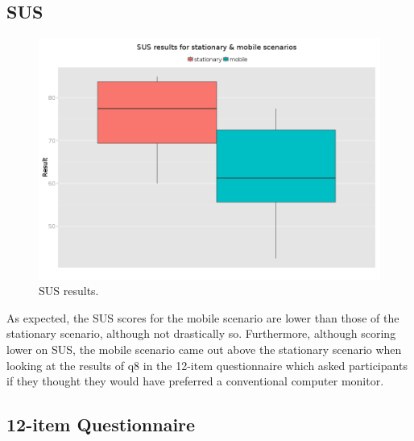 
\pagebreak

\subsection{SUS}

\begin{figure}[h]
	\begin{center}
		\includegraphics[width=0.7\linewidth]{images/1/sus.png}
		\caption{SUS results.}
		\label{sus}
	\end{center}
\end{figure}

As expected, the SUS scores for the mobile scenario are lower than those of the stationary scenario, although not drastically so. Furthermore, although scoring lower on SUS, the mobile scenario came out above the stationary scenario when looking at the results of q8 in the 12-item questionnaire which asked participants if they thought they would have preferred a conventional computer monitor.

\pagebreak

\subsection{12-item Questionnaire}

